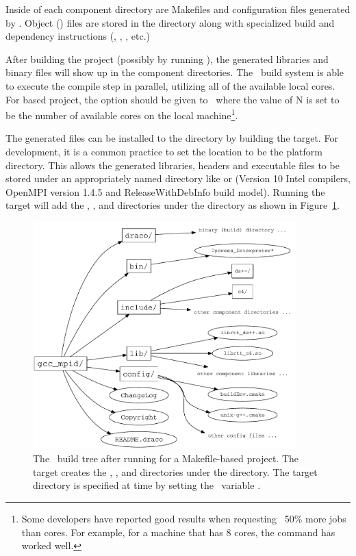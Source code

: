 Inside of each component directory are Makefiles and configuration files
generated by \cmake.  Object () files are stored in the  directory along with specialized build and dependency instructions (, , , etc.)

After building the project (possibly by running \make), the generated libraries and binary files will show up in the component directories.  The \draco\ build system is able to execute the compile step in parallel, utilizing all of the available local cores.  For  based project, the option  should be given to \make\ where the value of N is set to be the number of available cores on the local machine\footnote{Some developers have reported good results when requesting ~50\% more jobs than cores.  For example, for a machine that has 8 cores, the command  has worked well.}.  

The generated files can be installed to the  directory by building the  target.  For development, it is a common practice to set the  location to be the platform  directory.   This allows the generated libraries, headers and executable files to be stored under an appropriately named directory like  or  (Version 10 Intel compilers, OpenMPI version 1.4.5 and ReleaseWithDebInfo build model).  Running the  target will add the , ,  and  directories under the   directory as shown in Figure~\ref{fig:build_tree_post_install}.
\begin{figure}
  \centerline{\includegraphics[width=4in]{fig/build_tree_post_install}}
  \caption{The \draco\ build tree after running  for a Makefile-based project.  The  target creates  the , ,  and  directories under the   directory.  The target directory is specified at  time by setting the \cmake\ variable .}
  \label{fig:build_tree_post_install}
\end{figure}

